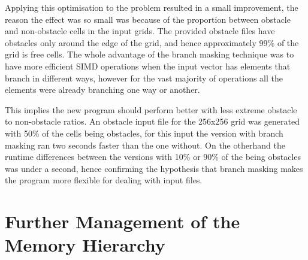 \documentclass[12pt, a4paper]{article}
\begin{document}
\begin{multicols}{2}
    Applying this optimisation to the problem resulted in a small improvement, the reason the effect was so small was because of the proportion between obstacle and non-obstacle cells in the input grids. The provided obstacle files have obstacles only around the edge of the grid, and hence approximately 99\% of the grid is free cells. The whole advantage of the branch masking technique was to have more efficient SIMD operations when the input vector has elements that branch in different ways, however for the vast majority of operations all the elements were already branching one way or another.

    This implies the new program should perform better with less extreme obstacle to non-obstacle ratios. An obstacle input file for the 256x256 grid was generated with 50\% of the cells being obstacles, for this input the version with branch masking ran two seconds faster than the one without. On the otherhand the runtime differences between the versions with 10\% or 90\% of the being obstacles was under a second, hence confirming the hypothesis that branch masking makes the program more flexible for dealing with input files.

  \end{multicols}

  \section*{Further Management of the Memory Hierarchy}
\end{document}
